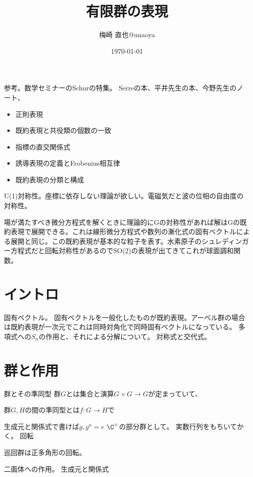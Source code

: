 \documentclass{jsarticle}
\title{有限群の表現}
\author{梅崎 直也@unaoya}
\date{\today}
\begin{document}
\maketitle
参考。数学セミナーのSchurの特集。
Serreの本、平井先生の本、今野先生のノート、

\begin{itemize}
\item 正則表現
\item 既約表現と共役類の個数の一致
\item 指標の直交関係式
\item 誘導表現の定義とFrobenius相互律
\item 既約表現の分類と構成
\end{itemize}

U(1)対称性。座標に依存しない理論が欲しい。電磁気だと波の位相の自由度の対称性。

場が満たすべき微分方程式を解くときに理論的にGの対称性があれば解はGの既約表現で展開できる。これは線形微分方程式や数列の漸化式の固有ベクトルによる展開と同じ。この既約表現が基本的な粒子を表す。水素原子のシュレディンガー方程式だと回転対称性があるのでSO(2)の表現が出てきてこれが球面調和関数。

\section{イントロ}
固有ベクトル。
固有ベクトルを一般化したものが既約表現。アーベル群の場合は既約表現が一次元でこれは同時対角化で同時固有ベクトルになっている。
多項式への$S_n$の作用と、それによる分解について。
対称式と交代式。

\section{群と作用}
\begin{dfn}
群とその準同型
群$G$とは集合と演算$G \times G \to G$が定まっていて、

群$G, H$の間の準同型とは$f:G \to H$で
\end{dfn}

\begin{eg}[巡回群]
生成元と関係式で書けば$g, g^n=e$
$\C^\times$の部分群として。
実数行列をもちいてかく。
回転
\end{eg}

巡回群は正多角形の回転。

\begin{eg}[二面体群]
二面体への作用。
生成元と関係式
\end{eg}
\end{document}
